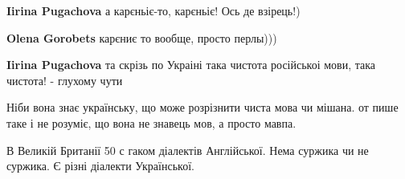 \begin{itemize}
 
\textbf{Iirina Pugachova} а карєньіє-то, карєньіє! Ось де взірець!)

 
\textbf{Olena Gorobets} карєниє то вообще, просто перлы)))

 
\textbf{Iirina Pugachova} та скрізь по Украіні така чистота російськоі мови, така чистота! - глухому чути
\end{itemize}

 
Ніби вона знає українську, що може розрізнити чиста мова чи мішана.
от пише таке і не розуміє, що вона не знавець мов, а просто мавпа.

 
В Великій Британії 50 с гаком діалектів Англійської. Нема суржика чи не суржика. Є різні діалекти Української.

 
